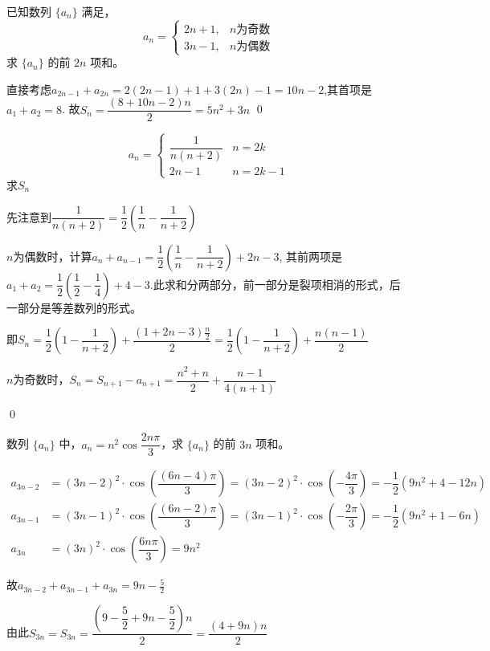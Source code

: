 \begin{example}
    已知数列 \(\{a_n\}\) 满足，
\[ a_n = 
\begin{cases} 
2n + 1, & n \text{为奇数} \\
3n - 1, & n \text{为偶数}
\end{cases}
\]
求 \(\{a_n\}\) 的前 \(2n\) 项和。
\end{example}
\begin{jie}
    直接考虑\(a_{2n-1}+a_{2n}=2(2n-1)+1+3(2n)-1=10n-2\),其首项是\(a_1+a_2=8\).
    故\(S_n=\dfrac{(8+10n-2)n}{2}=5n^2+3n\)
    \qed
\end{jie}
\begin{exercise}
    \[
    a_{n}=\left\{
        \begin{array}{ll}
        \dfrac{1}{n(n+2)}& n=2 k \\
        2 n-1&n=2 k-1
        \end{array}\right.
\]
求\(S_{n}\)
\end{exercise}
\begin{jie}先注意到\(\dfrac{1}{n(n+2)}=\dfrac{1}{2}\left(\dfrac{1}{n}-\dfrac{1}{n+2}\right)\)

    \(n\)为偶数时，计算\(a_{n}+a_{n-1}=\dfrac{1}{2}\left(\dfrac{1}{n}-\dfrac{1}{n+2}\right)+2 n-3 \),
    其前两项是\(a_1+a_2=\dfrac{1}{2}\left(\dfrac{1}{2}-\dfrac{1}{4}\right)+4-3\).此求和分两部分，前一部分是裂项相消的形式，后一部分是等差数列的形式。

    即\(S_n=\dfrac{1}{2}(1-\dfrac{1}{n+2})+\dfrac{(1+2n-3)\frac{n}{2}}{2}=\dfrac{1}{2}(1-\dfrac{1}{n+2})+\dfrac{n(n-1)}{2}\)

    \(n\)为奇数时，\(S_{n}=S_{n+1}-a_{n+1}=\dfrac{n^{2}+n}{2}+\dfrac{n-1}{4(n+1)}\)

    \qed
\end{jie}
\begin{example}
    数列 \(\{a_n\}\) 中，\(a_n = n^2 \cos \dfrac{2n\pi}{3}\)，求 \(\{a_n\}\) 的前 \(3n\) 项和。
\end{example}
\begin{jie}
    \begin{align*}
        a_{3n-2} & = (3n-2)^2 \cdot \cos\left(\dfrac{(6n-4)\pi}{3}\right) = (3n-2)^2 \cdot \cos\left(-\dfrac{4\pi}{3}\right) = -\dfrac{1}{2}(9n^2 + 4 - 12n) \\
        a_{3n-1} & = (3n-1)^2 \cdot \cos\left(\dfrac{(6n-2)\pi}{3}\right) = (3n-1)^2 \cdot \cos\left(-\dfrac{2\pi}{3}\right) = -\dfrac{1}{2}(9n^2 + 1 - 6n) \\
        a_{3n} & = (3n)^2 \cdot \cos\left(\dfrac{6n\pi}{3}\right) = 9n^2 
    \end{align*}

    故\(a_{3n-2}+a_{3n-1}+a_{3n}=9n - \frac{5}{2}\)

    由此\(S_{3n}=S_{3n}  = \dfrac{\left(9 - \dfrac{5}{2} + 9n - \dfrac{5}{2}\right)n}{2} = \dfrac{(4 + 9n)n}{2}\)
\end{jie}


